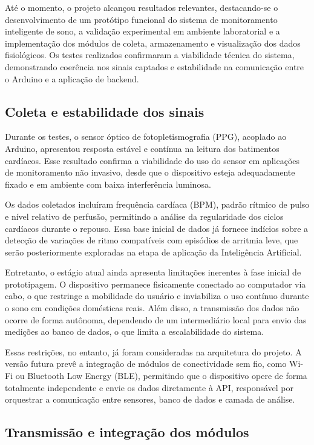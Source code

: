 Até o momento, o projeto alcançou resultados relevantes, destacando-se o desenvolvimento de um protótipo funcional do sistema de monitoramento inteligente de sono, a validação experimental em ambiente laboratorial e a implementação dos módulos de coleta, armazenamento e visualização dos dados fisiológicos. Os testes realizados confirmaram a viabilidade técnica do sistema, demonstrando coerência nos sinais captados e estabilidade na comunicação entre o Arduino e a aplicação de backend.

\subsection*{Coleta e estabilidade dos sinais}

Durante os testes, o sensor óptico de fotopletismografia (PPG), acoplado ao Arduino, apresentou resposta estável e contínua na leitura dos batimentos cardíacos. Esse resultado confirma a viabilidade do uso do sensor em aplicações de monitoramento não invasivo, desde que o dispositivo esteja adequadamente fixado e em ambiente com baixa interferência luminosa.

Os dados coletados incluíram frequência cardíaca (BPM), padrão rítmico de pulso e nível relativo de perfusão, permitindo a análise da regularidade dos ciclos cardíacos durante o repouso. Essa base inicial de dados já fornece indícios sobre a detecção de variações de ritmo compatíveis com episódios de arritmia leve, que serão posteriormente exploradas na etapa de aplicação da Inteligência Artificial.

Entretanto, o estágio atual ainda apresenta limitações inerentes à fase inicial de prototipagem. O dispositivo permanece fisicamente conectado ao computador via cabo, o que restringe a mobilidade do usuário e inviabiliza o uso contínuo durante o sono em condições domésticas reais. Além disso, a transmissão dos dados não ocorre de forma autônoma, dependendo de um intermediário local para envio das medições ao banco de dados, o que limita a escalabilidade do sistema.

Essas restrições, no entanto, já foram consideradas na arquitetura do projeto. A versão futura prevê a integração de módulos de conectividade sem fio, como Wi-Fi ou Bluetooth Low Energy (BLE), permitindo que o dispositivo opere de forma totalmente independente e envie os dados diretamente à API, responsável por orquestrar a comunicação entre sensores, banco de dados e camada de análise.

\subsection*{Transmissão e integração dos módulos}

